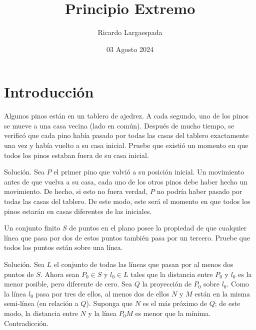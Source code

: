 \documentclass[11pt]{scrartcl}
\begin{document}
\title{Principio Extremo}
\author{Ricardo Largaespada}
\date{03 Agosto 2024}

\maketitle
\section{Introducción}


\begin{example}[Leningrado 1988]
    Algunos pinos están en un tablero de ajedrez. A cada segundo, uno de los pinos se mueve a una casa vecina (lado en común). Después de mucho tiempo, se verificó que cada pino había pasado por todas las casas del tablero exactamente una vez y había vuelto a su casa inicial. Pruebe que existió un momento en que todos los pinos estaban fuera de su casa inicial.
\end{example}
Solución. Sea \(P\) el primer pino que volvió a su posición inicial. Un movimiento antes de que vuelva a su casa, cada uno de los otros pinos debe haber hecho un movimiento. De hecho, si esto no fuera verdad, \(P\) no podría haber pasado por todas las casas del tablero. De este modo, este será el momento en que todos los pinos estarán en casas diferentes de las iniciales.

\begin{example}
    Un conjunto finito \(S\) de puntos en el plano posee la propiedad de que cualquier línea que pasa por dos de estos puntos también pasa por un tercero. Pruebe que todos los puntos están sobre una línea.
\end{example}
Solución. Sea \(L\) el conjunto de todas las líneas que pasan por al menos dos puntos de \(S\). Ahora sean \(P_0 \in S\) y \(l_0 \in L\) tales que la distancia entre \(P_0\) y \(l_0\) es la menor posible, pero diferente de cero. Sea \(Q\) la proyección de \(P_0\) sobre \(l_0\). Como la línea \(l_0\) pasa por tres de ellos, al menos dos de ellos \(N\) y \(M\) están en la misma semi-línea (en relación a \(Q\)). Suponga que \(N\) es el más próximo de \(Q\); de este modo, la distancia entre \(N\) y la línea \(P_0M\) es menor que la mínima. Contradicción.\\
\end{document}
